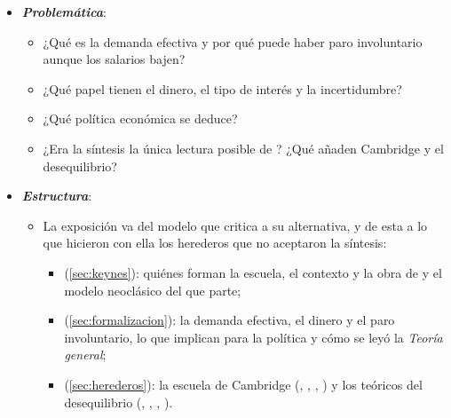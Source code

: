 \documentclass[11pt]{article}
\begin{document}
\begin{itemize}
\item \textbf{\emph{Problemática}}:
  \begin{itemize}
  \item ¿Qué es la demanda efectiva y por qué puede haber paro involuntario aunque los salarios bajen?
  \item ¿Qué papel tienen el dinero, el tipo de interés y la incertidumbre?
  \item ¿Qué política económica se deduce?
  \item ¿Era la síntesis la única lectura posible de ? ¿Qué añaden Cambridge y el desequilibrio?
  \end{itemize}

\item \textbf{\emph{Estructura}}:
  \begin{itemize}
  \item La exposición va del modelo que  critica a su alternativa, y de esta a lo que hicieron con ella los herederos que no aceptaron la síntesis:
  \begin{itemize}
  \item {} (\ref{sec:keynes}): quiénes forman la escuela, el contexto y la obra de  y el modelo neoclásico del que parte;
  \item {} (\ref{sec:formalizacion}): la demanda efectiva, el dinero y el paro involuntario, lo que implican para la política y cómo se leyó la \emph{Teoría general};
  \item {} (\ref{sec:herederos}): la escuela de Cambridge (, , , ) y los teóricos del desequilibrio (, , , ).
  \end{itemize}
  \end{itemize}
\end{itemize}
\end{document}

